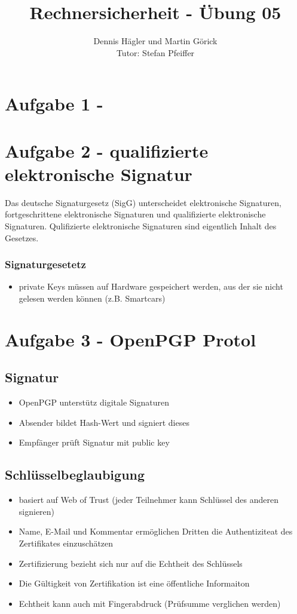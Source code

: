 \documentclass{scrartcl}
\title{Rechnersicherheit - Übung 05}
\author{Dennis Hägler und Martin Görick \\ Tutor: Stefan Pfeiffer}
\begin{document}
\maketitle


\section{Aufgabe 1 - }
\section{Aufgabe 2 - qualifizierte elektronische Signatur}
Das deutsche Signaturgesetz (SigG) unterscheidet elektronische Signaturen,
fortgeschrittene elektronische Signaturen und qualifizierte elektronische
Signaturen. Qulifizierte elektronische Signaturen sind eigentlich Inhalt des
Gesetzes.

\subsubsection{Signaturgesetetz}
\begin{itemize}
  \item private Keys müssen auf Hardware gespeichert werden, aus der sie nicht
gelesen werden können (z.B. Smartcars)
\end{itemize}

\section{Aufgabe 3 - OpenPGP Protol}
\subsection{Signatur}
\begin{itemize}
  \item OpenPGP unterstütz digitale Signaturen
  \item Absender bildet Hash-Wert und signiert dieses
  \item Empfänger prüft Signatur mit public key
\end{itemize}

\subsection{Schlüsselbeglaubigung}
\begin{itemize}
  \item basiert auf Web of Trust (jeder Teilnehmer kann Schlüssel des anderen
    signieren)
  \item Name, E-Mail und Kommentar ermöglichen Dritten die Authentiziteat des
    Zertifikates einzuschätzen
  \item Zertifizierung bezieht sich nur auf die Echtheit des Schlüssels
  \item Die Gültigkeit von Zertifikation ist eine öffentliche Informaiton
  \item Echtheit kann auch mit Fingerabdruck (Prüfsumme verglichen werden)
\end{itemize}
\end{document}
